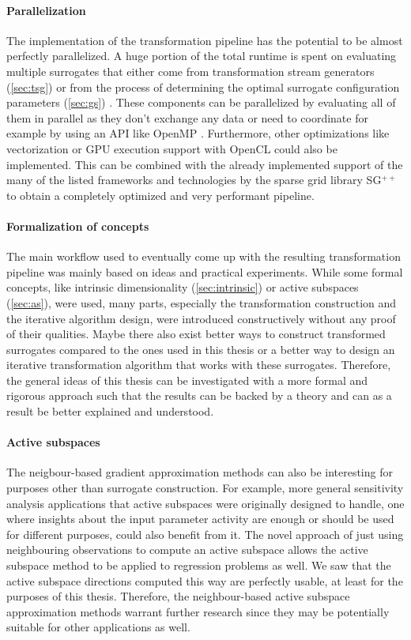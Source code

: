 \documentclass[
  a4paper,  %
  twoside,  %
  bibliography=totoc,
  headsepline,
  cleardoublepage=empty,
  parskip=half,
  draft=false
]{scrbook}
\begin{document}
\paragraph{Parallelization}
The implementation of the transformation pipeline has the potential to be almost perfectly parallelized.
A huge portion of the total runtime is spent on evaluating multiple surrogates that either come from transformation stream generators (\cref{sec:tsg}) or from the process of determining the optimal surrogate configuration parameters (\cref{sec:gs}) .
These components can be parallelized by evaluating all of them in parallel as they don't exchange any data or need to coordinate for example by using an API like OpenMP \cite{openmp08}.
Furthermore, other optimizations like vectorization \cite{Maleki2011} or GPU execution support with OpenCL \cite{Stone2010} could also be implemented.
This can be combined with the already implemented support of the many of the listed frameworks and technologies by the sparse grid library SG$^{++}$ to obtain a completely optimized and very performant pipeline.

\paragraph{Formalization of concepts}
The main workflow used to eventually come up with the resulting transformation pipeline was mainly based on ideas and practical experiments.
While some formal concepts, like intrinsic dimensionality (\cref{sec:intrinsic}) or active subspaces (\cref{sec:as}), were used, many parts, especially the transformation construction and the iterative algorithm design, were introduced constructively without any proof of their qualities.
Maybe there also exist better ways to construct transformed surrogates compared to the ones used in this thesis or a better way to design an iterative transformation algorithm that works with these surrogates.
Therefore, the general ideas of this thesis can be investigated with a more formal and rigorous approach such that the results can be backed by a theory and can as a result be better explained and understood.

\paragraph{Active subspaces}
The neigbour-based gradient approximation methods can also be interesting for purposes other than surrogate construction.
For example, more general sensitivity analysis applications that active subspaces were originally designed to handle, \ie one where insights about the input parameter activity are enough or should be used for different purposes, could also benefit from it.
The novel approach of just using neighbouring observations to compute an active subspace allows the active subspace method to be applied to regression problems as well.
We saw that the active subspace directions computed this way are perfectly usable, at least for the purposes of this thesis.
Therefore, the neighbour-based active subspace approximation methods warrant further research since they may be potentially suitable for other applications as well.
\end{document}
